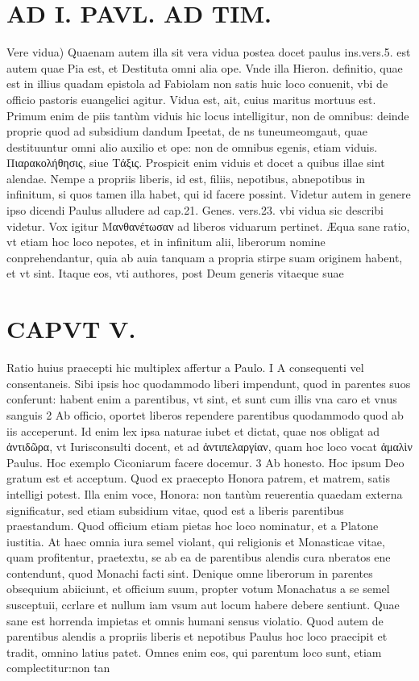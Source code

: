 \documentclass{article}
\begin{document}
\begin{pages}
\section*{AD I. PAVL. AD TIM. }
\marginpar{[ p.254 ]}\pstart Vere vidua) Quaenam autem illa sit vera vidua postea docet paulus ins.vers.5. est autem quae Pia est, et Destituta omni alia ope. Vnde illa Hieron. definitio, quae est in illius quadam epistola ad Fabiolam non satis huic loco conuenit, vbi de officio pastoris euangelici agitur. Vidua est, ait, cuius maritus mortuus est. Primum enim de piis tantùm viduis hic locus intelligitur, non de omnibus: deinde proprie quod ad subsidium dandum Ipeetat, de ns tuneumeomgaut, quae destituuntur omni alio auxilio et ope: non de omnibus egenis, etiam viduis.  \pend\pstart Πιαρακολήθησις, siue Τάξις. Prospicit enim viduis et docet a quibus illae sint alendae. Nempe a propriis liberis, id est, filiis, nepotibus, abnepotibus in infinitum, si quos tamen illa habet, qui id facere possint. Videtur autem in genere ipso dicendi Paulus alludere ad cap.21. Genes. vers.23. vbi vidua sic describi videtur.  \pend\pstart Vox igitur Μανθανέτωσαν ad liberos viduarum pertinet. Æqua sane ratio, vt etiam hoc loco nepotes, et in infinitum alii, liberorum nomine conprehendantur, quia ab auia tanquam a propria stirpe suam originem habent, et vt sint. Itaque eos, vti authores, post Deum generis vitaeque suae  \pend
\section*{CAPVT  V. }
\marginpar{[ p.255 ]}\pstart Ratio huius praecepti hic multiplex affertur a Paulo. I A consequenti vel consentaneis. Sibi ipsis hoc quodammodo liberi impendunt, quod in parentes suos conferunt: habent enim a parentibus, vt sint, et sunt cum illis vna caro et vnus sanguis 2 Ab officio, oportet liberos rependere parentibus quodammodo quod ab iis acceperunt. Id enim lex ipsa naturae iubet et dictat, quae nos obligat ad ἀντιδῶρα, vt Iurisconsulti docent, et ad ἀντιπελαργίαν, quam hoc loco vocat ἀμαλὶν Paulus. Hoc exemplo Ciconiarum facere docemur. 3 Ab honesto. Hoc ipsum Deo gratum est et acceptum. Quod ex praecepto Honora patrem, et matrem, satis intelligi potest. Illa enim voce, Honora: non tantùm reuerentia quaedam externa significatur, sed etiam subsidium vitae, quod est a liberis parentibus praestandum. Quod officium etiam pietas hoc loco nominatur, et a Platone iustitia. At haec omnia iura semel violant, qui religionis et Monasticae vitae, quam profitentur, praetextu, se ab ea de parentibus alendis cura nberatos ene contendunt, quod Monachi facti sint. Denique omne liberorum in parentes obsequium abiiciunt, et officium suum, propter votum Monachatus a se semel susceptuii, ccrlare et nullum iam vsum aut locum habere debere sentiunt. Quae sane est horrenda impietas et omnis humani sensus violatio. Quod autem de parentibus alendis a propriis  \pend\pstart liberis et nepotibus Paulus hoc loco praecipit et tradit, omnino latius patet. Omnes enim eos, qui parentum loco sunt, etiam complectitur:non tan\pend

\end{pages}
\end{document}

